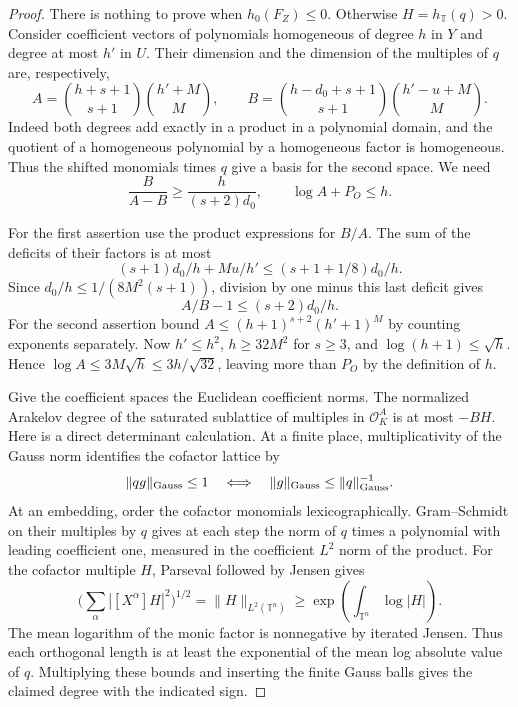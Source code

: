 \begin{proof}
There is nothing to prove when \(h_0(F_Z)\le0\). Otherwise
\(H=h_{\mathbb T}(q)>0\). Consider coefficient vectors of
polynomials homogeneous of degree \(h\) in \(Y\) and degree
at most \(h'\) in \(U\). Their dimension and the dimension of
the multiples of \(q\) are, respectively,
\[
 A=\binom{h+s+1}{s+1}\binom{h'+M}{M},\qquad
 B=\binom{h-d_0+s+1}{s+1}\binom{h'-u+M}{M}.
\]
Indeed both degrees add exactly in a product in a polynomial
domain, and the quotient of a homogeneous polynomial by a
homogeneous factor is homogeneous. Thus the shifted monomials
times \(q\) give a basis for the second space. We need
\[
 \frac{B}{A-B}\ge \frac h{(s+2)d_0},\qquad
                    \log A+P_O\le h .
\]

For the first assertion use the product expressions for \(B/A\).
The sum of the deficits of their factors is at most
\[
 (s+1)d_0/h+Mu/h'\le(s+1+1/8)d_0/h.
\]
Since \(d_0/h\le 1/(8M^2(s+1))\), division by one minus
this last deficit gives 
\[
  A/B-1\le(s+2)d_0/h.
\]
For the second assertion bound \(A\le(h+1)^{s+2}(h'+1)^M\)
by counting exponents separately. Now \(h'\le h^2\),
\(h\ge32M^2\) for \(s\ge3\), and \(\log(h+1)\le\sqrt h\).
Hence \(\log A\le3M\sqrt h\le3h/\sqrt{32}\), leaving
more than \(P_O\) by the definition of \(h\).

Give the coefficient spaces the Euclidean coefficient norms.
The normalized Arakelov degree of the saturated sublattice of
multiples in \(\mathcal O_K^A\) is at most \(-BH\).
Here is a direct determinant calculation. At a finite place, multiplicativity of the Gauss norm identifies the cofactor lattice by
\[
  \|qg\|_{\rm Gauss}\le1\quad\Longleftrightarrow\quad \|g\|_{\rm Gauss}\le\|q\|_{\rm Gauss}^{-1}.
\]
At an embedding, order the cofactor monomials lexicographically.
Gram--Schmidt on their multiples by \(q\) gives at each step
the norm of \(q\) times a polynomial with leading coefficient
one, measured in the coefficient \(L^2\) norm of the product.
For the cofactor multiple \(H\), Parseval followed by Jensen gives
\[
  \Big(\sum_\alpha |[X^\alpha]H|^2\Big)^{1/2}=\|H\|_{L^2(\mathbb T^n)}\ge\exp\!\left(\int_{\mathbb T^n}\log|H|\right).
\]
 The mean
logarithm of the monic factor is nonnegative by iterated
Jensen. Thus each orthogonal length is at least the
exponential of the mean log absolute value of \(q\). Multiplying
these bounds and inserting the finite Gauss balls gives
the claimed degree with the indicated sign.


\end{proof}
